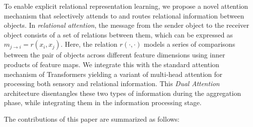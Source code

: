 To enable explicit relational representation learning, we propose a novel attention mechanism that selectively attends to and routes relational information between objects. In \textit{relational attention}, the message from the sender object to the receiver object consists of a set of relations between them, which can be expressed as $m_{j \to i} = r(x_i, x_j)$. Here, the relation $r(\cdot, \cdot)$ models a series of comparisons between the pair of objects across different feature dimensions using inner products of feature maps. We integrate this with the standard attention mechanism of Transformers yielding a variant of multi-head attention for processing both sensory and relational information. This \textit{Dual Attention} architecture disentangles these two types of information during the aggregation phase, while integrating them in the information processing stage.

The contributions of this paper are summarized as follows:

